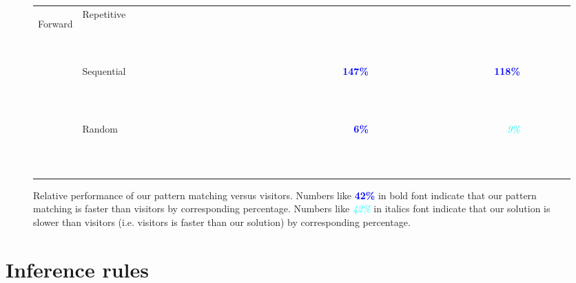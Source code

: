 \documentclass{article}
\newcommand{\f}[1]{{\scriptsize {\bf \textcolor{blue}{#1\%}}}}
\newcommand{\s}[1]{{\scriptsize {\em \textcolor{cyan}{#1\%}}}}
\newcommand{\n}[1]{{\scriptsize {\bf ~ ~ ~ ~ }}}
\begin{document}
\begin{figure*}
\begin{tabular}{@{}c@{ }l||@{ }r@{}@{ }r@{}@{ }r@{}|@{ }r@{}@{ }r@{}@{ }r@{}||@{ }r@{}@{ }r@{}@{ }r@{}|@{ }r@{}@{ }r@{}@{ }r@{}||@{ }r@{}@{ }r@{}@{ }r@{}|@{ }r@{}@{ }r@{}@{ }r@{}}
\hline %
\multirow{3}{*}{\begin{sideways}{\tiny Forward}\end{sideways}}
 & Repetitive &\n{   }&\n{   }&\n{   }&\n{   }&\n{   }&\n{   }&\n{   }&\n{   }&\n{   }&\n{   }&\n{   }&\n{   }&\n{   }&\n{   }&\n{   }&\n{   }&\n{   }&\n{   } \\
 & Sequential &\n{   }&\n{   }&\n{   }&\n{   }&\n{   }&\n{   }&\n{   }&\n{   }&\n{   }&\f{147}&\n{   }&\n{   }&\n{   }&\n{   }&\n{   }&\f{118}&\n{   }&\n{   } \\
 & Random     &\n{   }&\n{   }&\n{   }&\n{   }&\n{   }&\n{   }&\n{   }&\n{   }&\n{   }&\f{  6}&\n{   }&\n{   }&\n{   }&\n{   }&\n{   }&\s{  9}&\n{   }&\n{   } \\
\hline %
\end{tabular}
\caption{Relative performance of our pattern matching versus visitors. Numbers 
like \f{42} in bold font indicate that our pattern matching is faster than 
visitors by corresponding percentage. Numbers like \s{42} in italics font 
indicate that our solution is slower than visitors (i.e. visitors is faster than 
our solution) by corresponding percentage.}
\label{relperf}
\end{figure*}

\section{Inference rules}
\end{document}
